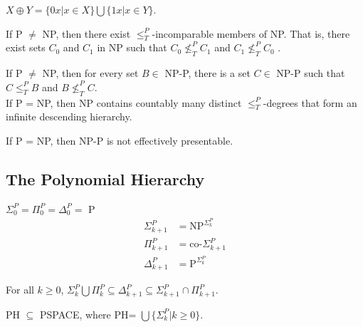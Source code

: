  $X \oplus Y = \{0x | x \in X\} \bigcup \{1x | x \in
Y\}$.

 If P $\ne$ NP, then there exist $\le^P_T$-incomparable
members of NP. That is, there exist sets $C_0$ and $C_1$ in NP such that 
$C_0 \nleq^P_T C_1$ and $C_1 \nleq^P_T C_0$ .

 If P $\ne$ NP, then for every set $B \in$ NP-P, there is a 
set $C \in$ NP-P such that $C \le^P_T B$ and $B \nleq^P_T C$.\\
If P = NP, then NP contains countably many distinct $\le^P_T$-degrees that form 
an infinite descending hierarchy.

 If P = NP, then NP-P is not effectively presentable.


\subsection{The Polynomial Hierarchy}

 $\Sigma^P_0 = \Pi^P_0 = \Delta^P_0 =$ P
\begin{align*}
  \Sigma^P_{k+1} & = \text{NP}^{\Sigma^P_{k}} \\
  \Pi^P_{k+1} &= \text{co-}\Sigma^P_{k+1} \\
  \Delta^P_{k+1} &= \text{P}^{\Sigma^P_{k}} 
\end{align*}

 For all $k \ge 0$, $\Sigma_k^P \bigcup \Pi_k^P \subseteq
\Delta_{k+1}^P \subseteq \Sigma_{k+1}^P \cap \Pi_{k+1}^P$.

 PH $\subseteq$ PSPACE, where PH= $\bigcup \{\Sigma^P_k|k \ge
0\}$.
